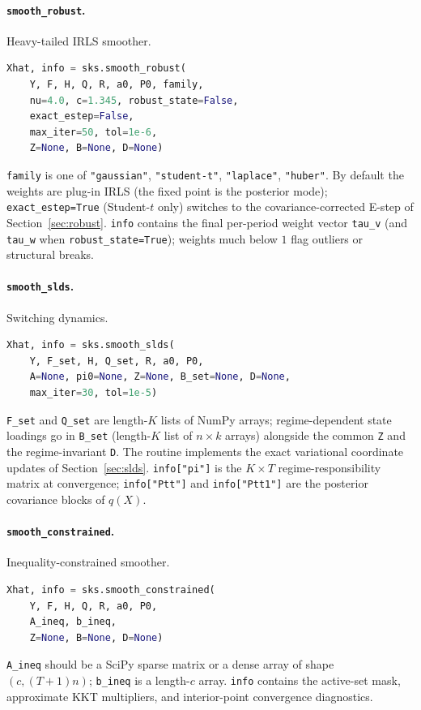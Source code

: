 \documentclass[11pt]{article}
\begin{document}
\paragraph{\texttt{smooth\_robust}.}  Heavy-tailed IRLS smoother.
\begin{lstlisting}[language=Python]
Xhat, info = sks.smooth_robust(
    Y, F, H, Q, R, a0, P0, family,
    nu=4.0, c=1.345, robust_state=False,
    exact_estep=False,
    max_iter=50, tol=1e-6,
    Z=None, B=None, D=None)
\end{lstlisting}
\texttt{family} is one of \texttt{"gaussian"}, \texttt{"student-t"},
\texttt{"laplace"}, \texttt{"huber"}.  By default the weights are
plug-in IRLS (the fixed point is the posterior mode);
\texttt{exact\_estep=True} (Student-$t$ only) switches to the
covariance-corrected E-step of Section~\ref{sec:robust}.
\texttt{info} contains the final per-period weight vector
\texttt{tau\_v} (and \texttt{tau\_w} when
\texttt{robust\_state=True}); weights much below $1$ flag outliers or
structural breaks.

\paragraph{\texttt{smooth\_slds}.}  Switching dynamics.
\begin{lstlisting}[language=Python]
Xhat, info = sks.smooth_slds(
    Y, F_set, H, Q_set, R, a0, P0,
    A=None, pi0=None, Z=None, B_set=None, D=None,
    max_iter=30, tol=1e-5)
\end{lstlisting}
\texttt{F\_set} and \texttt{Q\_set} are length-$K$ lists of NumPy
arrays; regime-dependent state loadings go in \texttt{B\_set}
(length-$K$ list of $n\times k$ arrays) alongside the common
\texttt{Z} and the regime-invariant \texttt{D}.  The routine
implements the exact variational coordinate updates of
Section~\ref{sec:slds}.  \texttt{info["pi"]} is the $K\times T$
regime-responsibility matrix at convergence;
\texttt{info["Ptt"]} and \texttt{info["Ptt1"]} are the posterior
covariance blocks of $q(X)$.

\paragraph{\texttt{smooth\_constrained}.}  Inequality-constrained smoother.
\begin{lstlisting}[language=Python]
Xhat, info = sks.smooth_constrained(
    Y, F, H, Q, R, a0, P0,
    A_ineq, b_ineq,
    Z=None, B=None, D=None)
\end{lstlisting}
\texttt{A\_ineq} should be a SciPy sparse matrix or a dense array of
shape $(c, (T+1)n)$; \texttt{b\_ineq} is a length-$c$ array.
\texttt{info} contains the active-set mask, approximate KKT
multipliers, and interior-point convergence diagnostics.
\end{document}
